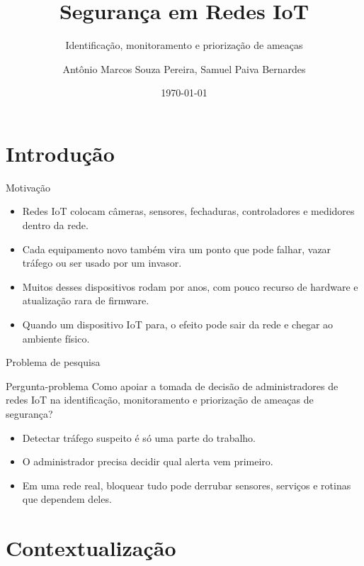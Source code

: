 \documentclass[aspectratio=169]{beamer}
\title{Segurança em Redes IoT}
\subtitle{Identificação, monitoramento e priorização de ameaças}
\date{\today}
\author{Antônio Marcos Souza Pereira, Samuel Paiva Bernardes}
\institute{DCC - UFJF}
\begin{document}
\maketitle


\section{Introdução}
\begin{frame}{Motivação}
    \begin{itemize}
        \item Redes IoT colocam câmeras, sensores, fechaduras, controladores e medidores dentro da rede.
        \item Cada equipamento novo também vira um ponto que pode falhar, vazar tráfego ou ser usado por um invasor.
        \item Muitos desses dispositivos rodam por anos, com pouco recurso de hardware e atualização rara de firmware.
        \item Quando um dispositivo IoT para, o efeito pode sair da rede e chegar ao ambiente físico.
    \end{itemize}
\end{frame}

\begin{frame}{Problema de pesquisa}
    \begin{block}{Pergunta-problema}
        Como apoiar a tomada de decisão de administradores de redes IoT na identificação, monitoramento e priorização de ameaças de segurança?
    \end{block}

    \vspace{0.3cm}
    \begin{itemize}
        \item Detectar tráfego suspeito é só uma parte do trabalho.
        \item O administrador precisa decidir qual alerta vem primeiro.
        \item Em uma rede real, bloquear tudo pode derrubar sensores, serviços e rotinas que dependem deles.
    \end{itemize}
\end{frame}

\section{Contextualização}
\end{document}
